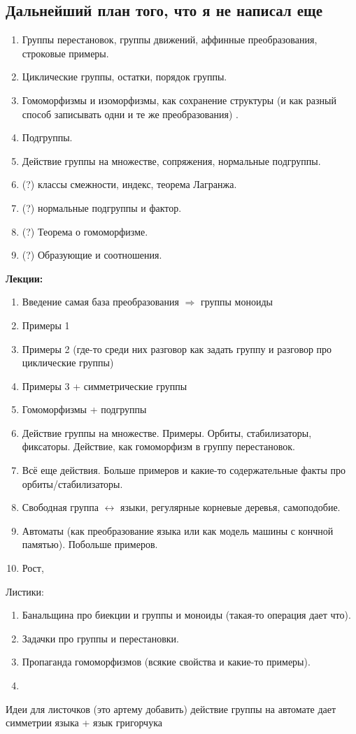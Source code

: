 \subsection{Дальнейший план того, что я не написал еще}

	\begin{enumerate}
		\item Группы перестановок, группы движений, аффинные преобразования, строковые примеры.  
		\item Циклические группы, остатки, порядок группы. 
		\item Гомоморфизмы и изоморфизмы, как сохранение структуры (и как разный способ записывать одни и те же преобразования) . 
		\item Подгруппы.
		\item Действие группы на множестве, сопряжения, нормальные подгруппы. 

		\item (?) классы смежности, индекс, теорема Лагранжа. 
		\item (?) нормальные подгруппы и фактор. 
		\item (?) Теорема о гомоморфизме. 
		\item (?) Образующие и соотношения. 
	\end{enumerate}

	\noindent\bf{Лекции:}
	\begin{enumerate}
		\item Введение самая база преобразования $\Rightarrow$ группы моноиды 
		\item Примеры 1 
		\item Примеры 2 (где-то среди них разговор как задать группу и разговор про циклические группы)
		\item Примеры 3 + симметрические группы
		\item Гомоморфизмы + подгруппы
		\item Действие группы на множестве. Примеры. Орбиты, стабилизаторы, фиксаторы. Действие, как гомоморфизм в группу перестановок. 
		\item Всё еще действия. Больше примеров и какие-то содержательные факты про орбиты/стабилизаторы. 
		\item Свободная группа $\leftrightarrow$ языки, регулярные корневые деревья, самоподобие. 
		\item Автоматы (как преобразование языка или как модель машины с кончной памятью). Побольше примеров. 
		\item Рост,  %

	\end{enumerate}

	Листики: 
	\begin{enumerate}
		\item Банальщина про биекции и группы и моноиды (такая-то операция дает что).
		\item Задачки про группы и перестановки.
		\item Пропаганда гомоморфизмов (всякие свойства и какие-то примеры).
		\item 

	\end{enumerate}
	Идеи для листочков (это артему добавить) действие группы на автомате дает симметрии языка + язык григорчука